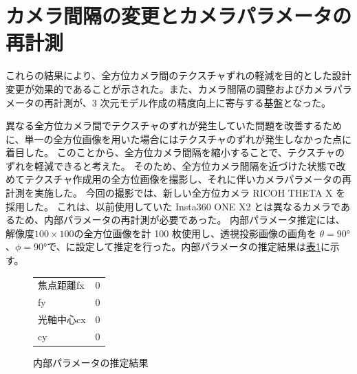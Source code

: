 \documentclass[]{jarticle}          %
\begin{document}
\section{カメラ間隔の変更とカメラパラメータの再計測}
これらの結果により、全方位カメラ間のテクスチャずれの軽減を目的とした設計変更が効果的であることが示された。また、カメラ間隔の調整およびカメラパラメータの再計測が、3 次元モデル作成の精度向上に寄与する基盤となった。

異なる全方位カメラ間でテクスチャのずれが発生していた問題を改善するために、単一の全方位画像を用いた場合にはテクスチャのずれが発生しなかった点に着目した。
このことから、全方位カメラ間隔を縮小することで、テクスチャのずれを軽減できると考えた。
そのため、全方位カメラ間隔を近づけた状態で改めてテクスチャ作成用の全方位画像を撮影し、それに伴いカメラパラメータの再計測を実施した。
今回の撮影では、新しい全方位カメラ RICOH THETA X を採用した。
これは、以前使用していた Insta360 ONE X2 とは異なるカメラであるため、内部パラメータの再計測が必要であった。
内部パラメータ推定には、解像度$100\times100$の全方位画像を計 100 枚使用し、透視投影画像の画角を
$\theta=90°$、$\phi=90°$で、に設定して推定を行った。内部パラメータの推定結果は\hyperref[table1]{表\ref{table1}}に示す。
\begin{figure}[H]
  \begin{center}
    \begin{tabular}{lc}
    焦点距離fx & 0\\
    fy & 0\\
    光軸中心cx & 0\\
    cy & 0
    \end{tabular}
  \end{center}
  \caption{内部パラメータの推定結果}
  \label{table1}
\end{figure}
\end{document}
